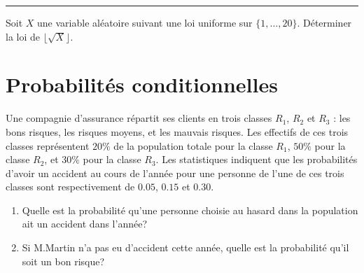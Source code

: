 \documentclass[../PolyS4.tex]{subfiles}
\begin{document}
\hfill\break
\hrule
\hfill\break




Soit $X$ une variable aléatoire suivant une loi uniforme sur $\{1,\dots,20\}$. Déterminer la loi de $\lfloor \sqrt X\rfloor$.\\


\section{Probabilités conditionnelles}




Une compagnie d'assurance répartit ses clients en trois classes $R_1$, $R_2$ et $R_3$ : les bons risques, les risques moyens, et les mauvais risques.
Les effectifs de ces trois classes représentent $20\%$ de la population totale pour la classe $R_1$, $50\%$ pour la classe $R_2$, et 
$30\%$ pour la classe $R_3$. Les statistiques indiquent que les probabilités d'avoir un accident au cours de l'année pour une personne de l'une de ces trois classes sont respectivement de $0.05$, $0.15$ et $0.30$.
\begin{enumerate}
\item Quelle est la probabilité qu'une personne choisie au hasard dans la population ait un accident dans l'année?
\item Si M.Martin n'a pas eu d'accident cette année, quelle est la probabilité qu'il soit un bon risque?\\
\end{enumerate}



\end{document}
